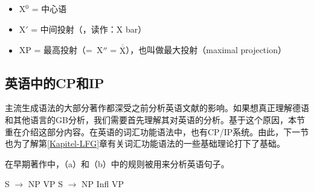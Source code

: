 \begin{itemize}
\item X$^0$ = 中心语
\item X$'$ = 中间投射（\xbar ，读作：X bar）
\item XP = 最高投射（=~X$''$ = $\overline{\overline{\mbox{X}}}$），也叫做最大投射（maximal projection） 
\end{itemize}

\subsection{英语中的CP和IP}
\label{Abschnitt-GB-CP-IP-System-Englisch}\label{sec-GB-CP-IP-System-English}

主流生成语法的大部分著作都深受之前分析英语文献的影响。如果想真正理解德语和其他语言的GB分析，我们需要首先理解其对英语的分析。基于这个原因，本节重在介绍这部分内容。在英语的词汇功能语法中，也有CP/IP系统。由此，下一节也为了解第\ref{Kapitel-LFG}章有关词汇功能语法的一些基础理论打下了基础。

在早期著作中，（a）和（b）中的规则被用来分析英语句子\citep[]{Chomsky81a}。

\eal
\ex S $\to$ NP VP
\ex S $\to$ NP Infl VP
\zl

